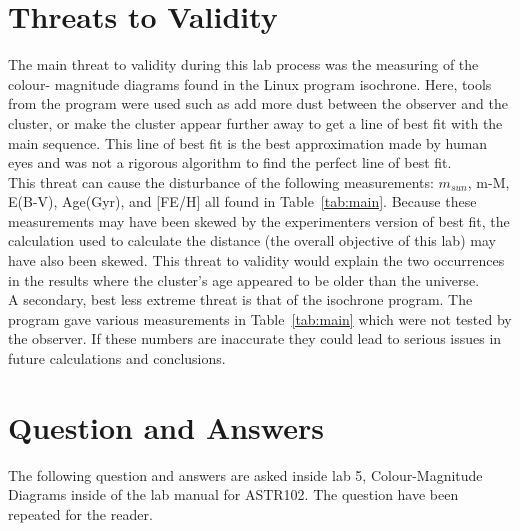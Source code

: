 \documentclass{article}
\begin{document}
\section{Threats to Validity}

The main threat to validity during this lab process was the measuring of the colour-
magnitude diagrams found in the Linux program isochrone. Here, tools from the program
were used such as add more dust between the observer and the cluster, or make the cluster
appear further away to get a line of best fit with the main sequence. This line of best 
fit is the best approximation made by human eyes and was not a rigorous algorithm to
find the perfect line of best fit.\\

This threat can cause the disturbance of the following measurements: $m_{sun}$, m-M,
E(B-V), Age(Gyr), and [FE/H] all found in Table~\ref{tab:main}. Because these measurements
may have been skewed by the experimenters version of best fit, the calculation used
to calculate the distance (the overall objective of this lab) may have also been skewed.
This threat to validity would explain the two occurrences in the results where the cluster's
age appeared to be older than the universe.\\

A secondary, best less extreme threat is that of the isochrone program. The program
gave various measurements in Table~\ref{tab:main} which were not tested by the observer.
If these numbers are inaccurate they could lead to serious issues in future calculations
and conclusions.


\section{Question and Answers}
\label{sec:qna}

The following question and answers are asked inside lab 5, Colour-Magnitude Diagrams
inside of the lab manual for ASTR102. The question have been repeated for the reader.
\end{document}
